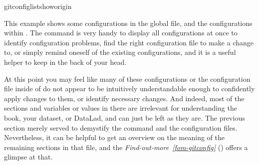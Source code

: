 \begin{sphinxVerbatim}[commandchars=\\\{\}]
gitconfig\PYGZhy{}\PYGZhy{}list\PYGZhy{}\PYGZhy{}show\PYGZhy{}origin
\end{sphinxVerbatim}

\sphinxAtStartPar
This example shows some configurations in the global 
file, and the configurations within .
The command is very handy to display all configurations at once to identify
configuration problems, find the right configuration file to make a change to,
or simply remind oneself of the existing configurations, and it is a useful
helper to keep in the back of your head.

\sphinxAtStartPar
At this point you may feel like many of these configurations or the configuration file
inside of  do not appear to be
intuitively understandable enough to confidently apply changes to them,
or identify necessary changes. And indeed, most of the sections and variables
or values in there are irrelevant for understanding the book, your dataset,
or DataLad, and can just be left as they are. The previous section merely served
to de\sphinxhyphen{}mystify the  command and the configuration files.
Nevertheless, it can be helpful to get an overview on the meaning of the
remaining sections in that file, and the \textit{Find-out-more}~{\findoutmoreiconinline}\textit{\ref{fom-gitconfig}} {\hyperref[\detokenize{basics/101-122-config:fom-gitconfig}]{}} () offers a glimpse at that.

